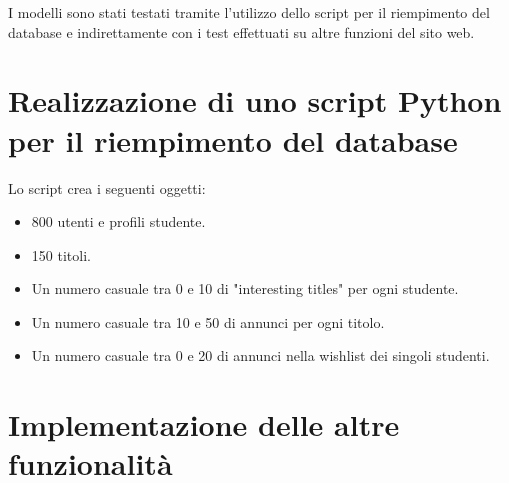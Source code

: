 \documentclass[10pt,a4paper]{report}
\begin{document}
	I modelli sono stati testati tramite l'utilizzo dello script per il riempimento del database e indirettamente con i test effettuati su altre funzioni del sito web.
	
	\section{Realizzazione di uno script Python per il riempimento del database}
	Lo script crea i seguenti oggetti:
	\begin{itemize}
		\item 800 utenti e profili studente.
		\item 150 titoli.
		\item Un numero casuale tra 0 e 10 di "interesting titles" per ogni studente.
		\item Un numero casuale tra 10 e 50 di annunci per ogni titolo.
		\item Un numero casuale tra 0 e 20 di annunci nella wishlist dei singoli studenti.
	\end{itemize}

	\section{Implementazione delle altre funzionalità}
	
	
\end{document}
